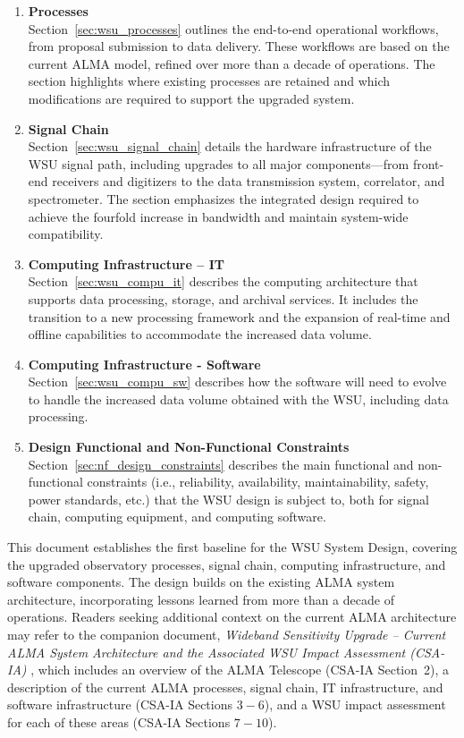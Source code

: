 \begin{enumerate}
\item \textbf{Processes}\\
Section~\ref{sec:wsu_processes} outlines the end-to-end operational workflows, from proposal submission to data delivery. These workflows are based on the current ALMA model, refined over more than a decade of operations. The section highlights where existing processes are retained and which modifications are required to support the upgraded system.

\item \textbf{Signal Chain}\\
Section~\ref{sec:wsu_signal_chain} details the hardware infrastructure of the \ac{WSU} signal path, including upgrades to all major components—from front-end receivers and digitizers to the data transmission system, correlator, and spectrometer. The section emphasizes the integrated design required to achieve the fourfold increase in bandwidth and maintain system-wide compatibility.

\item \textbf{Computing Infrastructure – IT}\\
Section~\ref{sec:wsu_compu_it} describes the computing architecture that supports data processing, storage, and archival services. It includes the transition to a new processing framework and the expansion of real-time and offline capabilities to accommodate the increased data volume.

\item \textbf{Computing Infrastructure - Software}\\
Section~\ref{sec:wsu_compu_sw} describes how the software will need to evolve to handle the increased data volume obtained with the WSU, including data processing.

\item \textbf{Design Functional and Non-Functional Constraints}\\
Section~\ref{sec:nf_design_constraints} describes the main functional and non-functional constraints (i.e., reliability, availability, maintainability, safety, power standards, etc.) that the WSU design is subject to, both for signal chain, computing equipment, and computing software.

\end{enumerate}

This document establishes the first baseline for the WSU System Design, covering the upgraded observatory processes, signal chain, computing infrastructure, and software components. The design builds on the existing ALMA system architecture, incorporating lessons learned from more than a decade of operations. Readers seeking additional context on the current ALMA architecture may refer to the companion document, \textit{Wideband Sensitivity Upgrade – Current ALMA System Architecture and the Associated WSU Impact Assessment (CSA-IA)} \cite{CSA-IA}, 
which includes an overview of the ALMA Telescope (CSA-IA Section~2),
a description of the current ALMA processes, signal chain, \ac{IT} infrastructure, and software infrastructure  (CSA-IA Sections $3-6$), and a WSU impact assessment for each of these areas (CSA-IA Sections $7-10$).




